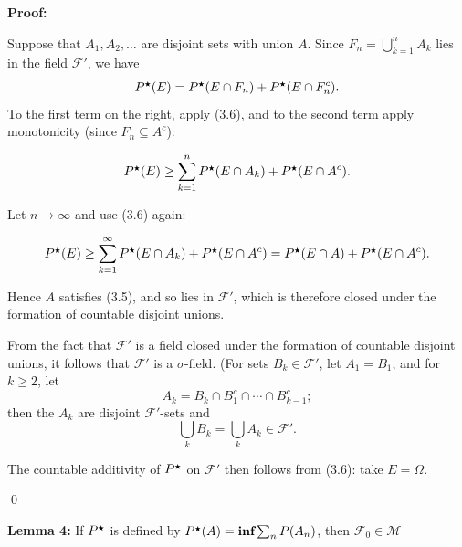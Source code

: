    \textbf{Proof: }
    \vspace{-1ex}
    \begin{proofline}
        Suppose that \( A_1, A_2, \ldots \) are disjoint sets with union \( A \). Since $F_n = \bigcup_{k=1}^{n} A_k$
        lies in the field \( \mathcal{F}' \), we have
        \[
        P^{\medstar}(E) = P^{\medstar}(E \cap F_n) + P^{\medstar}(E \cap F_n^c).
        \]
        To the first term on the right, apply (3.6), and to the second term apply monotonicity (since \( F_n \subseteq A^c \)):
        
        \[
        P^{\medstar}(E) \geq \sum_{k=1}^{n} P^{\medstar}(E \cap A_k) + P^{\medstar}(E \cap A^c).
        \]
        
        Let \( n \to \infty \) and use (3.6) again:
        
        \[
        P^{\medstar}(E) \geq \sum_{k=1}^{\infty} P^{\medstar}(E \cap A_k) + P^{\medstar}(E \cap A^c)
        = P^{\medstar}(E \cap A) + P^{\medstar}(E \cap A^c).
        \]
        
        Hence \( A \) satisfies (3.5), and so lies in \( \mathcal{F}' \), which is therefore closed under the formation of countable disjoint unions.
        
        \medskip
        
        From the fact that \( \mathcal{F}' \) is a field closed under the formation of countable disjoint unions, it follows that \( \mathcal{F}' \) is a \( \sigma \)-field. (For sets \( B_k \in \mathcal{F}' \), let \( A_1 = B_1 \), and for \( k \geq 2 \), let
        \[
        A_k = B_k \cap B_1^c \cap \cdots \cap B_{k-1}^c;
        \]
        then the \( A_k \) are disjoint \( \mathcal{F}' \)-sets and
        \[
        \bigcup_k B_k = \bigcup_k A_k \in \mathcal{F}'.
        \]
        
        The countable additivity of \( P^{\medstar} \) on \( \mathcal{F}' \) then follows from (3.6): take $E=\Omega$.

        \hfill \qed 
    \end{proofline}
    
     \textbf{Lemma 4: } If $P^{\medstar}$ is defined by $P^{\medstar}(A)=\textbf{inf}\sum_n P(A_n)$, then $\mathcal{F}_0 \in \mathcal{M}$

